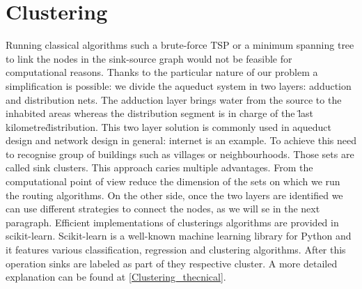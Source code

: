 \section{Clustering}
Running classical algorithms such a brute-force TSP or a minimum spanning tree to link
the nodes in the sink-source graph would not be feasible for computational reasons. 
Thanks to the particular nature of our problem a simplification is possible: we divide the aqueduct
system in two layers: adduction and distribution nets. The adduction layer brings water from the
source to the inhabited areas whereas the distribution segment is in charge of the \"last kilometre\" 
distribution. This two layer solution is commonly used in aqueduct design and network design in 
general: internet is an example. To achieve this need to recognise group of buildings such as villages 
or neighbourhoods. Those sets are called sink clusters.
This approach caries multiple advantages. From the computational point of view reduce the dimension 
of the sets on which we run the routing algorithms.  On the other side, once the two layers are 
identified we can use different strategies to connect the nodes, as we will se in the next paragraph.
Efficient implementations of clusterings algorithms are provided in scikit-learn. Scikit-learn is a 
well-known machine learning library for Python and it features various classification, regression and
clustering algorithms. After this operation sinks are labeled as part of they respective cluster. 
A more detailed explanation can be found at \ref{Clustering_thecnical}.

